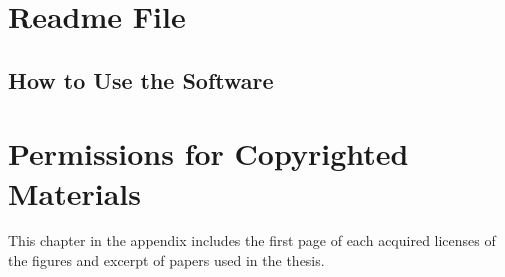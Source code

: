 
\chapter{Readme File}\label{Apndx:readme-ga-eoc}
\makeatletter 
\renewcommand{\thefigure}{S\@arabic\c@figure}
\renewcommand{\thetable}{S\@arabic\c@table}
\makeatother


\section*{How to Use the Software}



\chapter{Permissions for Copyrighted Materials}\label{Apndx:license}
This chapter in the appendix includes the first page of each acquired licenses of the figures and excerpt of papers used in the thesis. %


